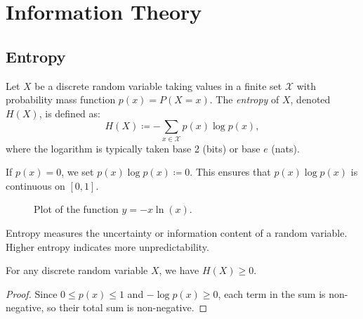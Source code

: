 \documentclass[../../main.tex]{subfiles}
\begin{document}
\section{Information Theory}

\subsection{Entropy}

\begin{definition}[Entropy]
Let \( X \) be a discrete random variable taking values in a finite set \( \mathcal{X} \) with probability mass function \( p(x) = P(X = x) \). The \emph{entropy} of \( X \), denoted \( H(X) \), is defined as:
\[
H(X) \coloneqq - \sum_{x \in \mathcal{X}} p(x) \log p(x),
\]
where the logarithm is typically taken base 2 (bits) or base \( e \) (nats).
\end{definition}

\begin{remark}
    If $p(x) = 0$, we set $p(x) \log p(x) \coloneqq 0$. This ensures that $p(x) \log p(x)$ is continuous on $[0, 1]$.
\end{remark}

\begin{figure}[h]
    \centering
{}
    \caption{Plot of the function $y=-x\ln(x)$.}
\end{figure}

\begin{remark}
Entropy measures the uncertainty or information content of a random variable. Higher entropy indicates more unpredictability.
\end{remark}

\begin{proposition}
For any discrete random variable \( X \), we have \( H(X) \geq 0 \).
\end{proposition}
\vspace{-2.5em}
\begin{proof}
Since \( 0 \leq p(x) \leq 1 \) and \( -\log p(x) \geq 0 \), each term in the sum is non-negative, so their total sum is non-negative.
\end{proof}
\end{document}
